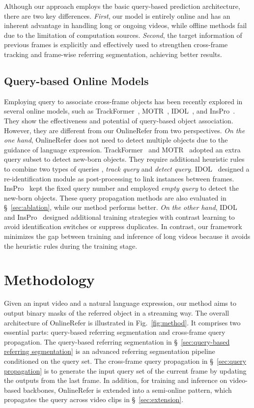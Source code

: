 \documentclass[10pt,twocolumn,letterpaper]{article}
\begin{document}
Although our approach employs the basic query-based prediction architecture, there are two key differences. 
\textit{First}, our model is entirely online and has an inherent advantage in handling long or ongoing videos, while offline methods fail due to the limitation of computation sources.
\textit{Second}, the target information of previous frames is explicitly and effectively used to strengthen cross-frame tracking and frame-wise referring segmentation, achieving better results.



\subsection{Query-based Online Models}
Employing query to associate cross-frame objects has been recently explored in several online models, such as TrackFormer~\cite{trackformer}, MOTR~\cite{motr}, IDOL~\cite{IDOL}, and InsPro~\cite{inspro}.
They show the effectiveness and potential of query-based object association.
However, they are different from our OnlineRefer from two perspectives.
\textit{On the one hand}, OnlineRefer does not need to detect multiple objects due to the guidance of language expression.
TrackFormer~\cite{trackformer} and MOTR~\cite{motr,wu2023referring} adopted an extra query subset to detect new-born objects. They require additional heuristic rules to combine two types of queries \ie,  \textit{track query} and \textit{detect query}.
IDOL~\cite{IDOL} designed a re-identification module as post-processing to link instances between frames.
InsPro~\cite{inspro} kept the fixed query number and employed \textit{empty query}  to detect the new-born objects.
These query propagation methods are also evaluated in \S~\ref{sec:ablation}, while our method performs better.
\textit{On the other hand}, IDOL~\cite{IDOL} and InsPro~\cite{inspro} designed additional training strategies with contrast learning to avoid identification switches or suppress duplicates.
In contrast, our framework minimizes the gap between training and inference of long videos because it avoids the heuristic rules during the training stage.

\section{Methodology}

Given an input video and a natural language expression, our method aims to output binary masks of the referred object in a streaming way.
The overall architecture of OnlineRefer is illustrated in Fig.~\ref{fig:method}. 
It comprises two essential parts: query-based referring segmentation and cross-frame query propagation.
The query-based referring segmentation in \S~\ref{sec:query-based referring segmentation} is an advanced referring segmentation pipeline conditioned on the query set.
The cross-frame query propagation in \S~\ref{sec:query propagation} is to generate the input query set of the current frame by updating the outputs from the last frame.
In addition, for training and inference on video-based backbones, OnlineRefer is extended into a semi-online pattern, which propagates the query across video clips in \S~\ref{sec:extension}.
\end{document}
